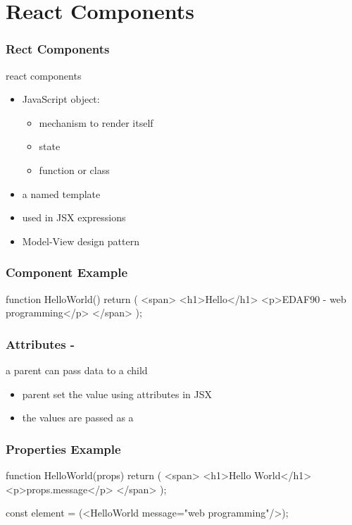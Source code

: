 \section{React Components}
\begin{frame}[fragile] \frametitle{Rect Components}
react components
\begin{itemize}
  \item JavaScript object:
  \begin{itemize}
    \item mechanism to render itself
    \item state
    \item function or class
  \end{itemize}
  \item a named template
  \item used in JSX expressions
  \item Model-View design pattern
\end{itemize}
\end{frame}

\begin{frame}[fragile] \frametitle{Component Example}
\begin{CodeBox}{}
  function HelloWorld(){
    return (
      <span>
        <h1>Hello</h1>
        <p>EDAF90 - web programming</p>
      </span>
    );
  }
\end{CodeBox}
\end{frame}
\begin{frame}[fragile] \frametitle{Attributes - }
a parent can pass data to a child
\begin{itemize}
  \item parent set the value using attributes in JSX
  \item the values are passed as a 
\end{itemize}
\end{frame}

\begin{frame}[fragile] \frametitle{Properties Example}

\begin{CodeBox}{}
function HelloWorld(props) {
  return (
    <span>
      <h1>Hello World</h1>
      <p>{props.message}</p>
    </span>
  );
}

const element = (<HelloWorld message="web programming"/>);
\end{CodeBox}
\end{frame}


